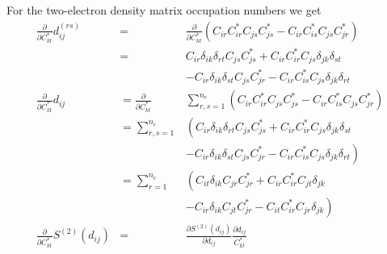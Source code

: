 \documentclass[pra]{revtex4-1}
\begin{document}
For the two-electron density matrix occupation numbers we get
\begin{eqnarray}
   \frac{\partial}{\partial C^*_{kt}}d^{(rs)}_{ij}
   &=& \frac{\partial}{\partial C^*_{kt}}\left(
         C_{ir}C^*_{ir}C_{js}C^*_{js}
       - C_{ir}C^*_{is}C_{js}C^*_{jr}
       \right) \\
   &=& C_{ir}\delta_{ik}\delta_{rt}C_{js}C^*_{js}
    +  C_{ir}C^*_{ir}C_{js}\delta_{jk}\delta_{st} \nonumber \\
   &&- C_{ir}\delta_{ik}\delta_{st}C_{js}C^*_{jr}
    -  C_{ir}C^*_{is}C_{js}\delta_{jk}\delta_{rt} \\
   \frac{\partial}{\partial C^*_{kt}}d_{ij}
   &=  \frac{\partial}{\partial C^*_{kt}}&\sum_{r,s=1}^{n_e}\left(
         C_{ir}C^*_{ir}C_{js}C^*_{js}
       - C_{ir}C^*_{is}C_{js}C^*_{jr}
       \right) \\
   &=  \sum_{r,s=1}^{n_e}&\left(C_{ir}\delta_{ik}\delta_{rt}C_{js}C^*_{js}
    +  C_{ir}C^*_{ir}C_{js}\delta_{jk}\delta_{st}\right. \nonumber \\
   &&- \left.C_{ir}\delta_{ik}\delta_{st}C_{js}C^*_{jr}
    -  C_{ir}C^*_{is}C_{js}\delta_{jk}\delta_{rt}\right) \\
   &=  \sum_{r=1}^{n_e}&\left(C_{it}\delta_{ik}C_{jr}C^*_{jr}
    +  C_{ir}C^*_{ir}C_{jt}\delta_{jk}\right. \nonumber \\
   &&- \left.C_{ir}\delta_{ik}C_{jt}C^*_{jr}
    -  C_{it}C^*_{ir}C_{jr}\delta_{jk}\right) \\
   \frac{\partial}{\partial C^*_{kt}}S^{(2)}(d_{ij})
   &=& \frac{\partial S^{(2)}(d_{ij})}{\partial d_{ij}}\frac{\partial d_{ij}}{C^*_{kt}} \\
\end{eqnarray}
\end{document}

